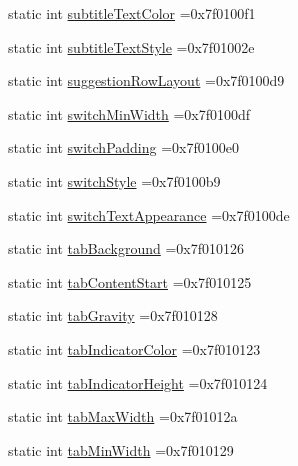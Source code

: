 \begin{DoxyCompactItemize}
\item 
static int \hyperlink{classandroid_1_1support_1_1v7_1_1appcompat_1_1R_1_1attr_aa13ebb30d6c238f765d0bf427fec0c76}{subtitle\+Text\+Color} =0x7f0100f1
\item 
static int \hyperlink{classandroid_1_1support_1_1v7_1_1appcompat_1_1R_1_1attr_a2a9a010f70cdd5dd8a5b63782382f5f7}{subtitle\+Text\+Style} =0x7f01002e
\item 
static int \hyperlink{classandroid_1_1support_1_1v7_1_1appcompat_1_1R_1_1attr_a0ee770ca62d467ea8536270fe48d2bb2}{suggestion\+Row\+Layout} =0x7f0100d9
\item 
static int \hyperlink{classandroid_1_1support_1_1v7_1_1appcompat_1_1R_1_1attr_aafe6db8b889a67906f7cccf72cb3bca4}{switch\+Min\+Width} =0x7f0100df
\item 
static int \hyperlink{classandroid_1_1support_1_1v7_1_1appcompat_1_1R_1_1attr_add600be9acdf3c047a7d45235678c4fb}{switch\+Padding} =0x7f0100e0
\item 
static int \hyperlink{classandroid_1_1support_1_1v7_1_1appcompat_1_1R_1_1attr_aa7ea181c951ce6ec2cc6cbbb8d368909}{switch\+Style} =0x7f0100b9
\item 
static int \hyperlink{classandroid_1_1support_1_1v7_1_1appcompat_1_1R_1_1attr_a916b122ead6607d761f230b3b85f3f71}{switch\+Text\+Appearance} =0x7f0100de
\item 
static int \hyperlink{classandroid_1_1support_1_1v7_1_1appcompat_1_1R_1_1attr_a71cdff75d6b555ac21d02a8b344827ad}{tab\+Background} =0x7f010126
\item 
static int \hyperlink{classandroid_1_1support_1_1v7_1_1appcompat_1_1R_1_1attr_a9c7686f50ebedc57677affd040baeb34}{tab\+Content\+Start} =0x7f010125
\item 
static int \hyperlink{classandroid_1_1support_1_1v7_1_1appcompat_1_1R_1_1attr_a5d6760873df12ac6f6ed6f1972613390}{tab\+Gravity} =0x7f010128
\item 
static int \hyperlink{classandroid_1_1support_1_1v7_1_1appcompat_1_1R_1_1attr_a21aa1690b4be79b22f649ba6804cc05f}{tab\+Indicator\+Color} =0x7f010123
\item 
static int \hyperlink{classandroid_1_1support_1_1v7_1_1appcompat_1_1R_1_1attr_a0f9821181dbe0b7ee51ea0d5d79317ba}{tab\+Indicator\+Height} =0x7f010124
\item 
static int \hyperlink{classandroid_1_1support_1_1v7_1_1appcompat_1_1R_1_1attr_a1202bed5215506aa76adc2844554f4fe}{tab\+Max\+Width} =0x7f01012a
\item 
static int \hyperlink{classandroid_1_1support_1_1v7_1_1appcompat_1_1R_1_1attr_a041fb93bdb43040bd8123acef375698e}{tab\+Min\+Width} =0x7f010129

\end{DoxyCompactItemize}
